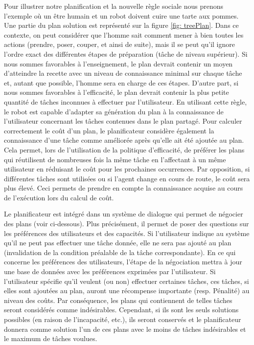 \documentclass[a4paper,11pt,twoside]{StyleThese}
\begin{document}
Pour illustrer notre planification et la nouvelle règle sociale nous prenons l'exemple où un être humain et un robot doivent cuire une tarte aux pommes. Une partie du plan solution est représenté sur la figure \ref{fig: treePlan}. Dans ce contexte, on peut considérer que l'homme sait comment mener à bien toutes les actions (prendre, poser, couper, et ainsi de suite), mais il se peut qu'il ignore  l'ordre exact des différentes étapes de préparation (tâche de niveau supérieur). Si nous sommes favorables à l'enseignement, le plan devrait contenir un moyen d'atteindre la recette avec un niveau de connaissance minimal sur chaque tâche et, autant que possible, l'homme sera en charge de ces étapes. D'autre part, si nous sommes favorables à l'efficacité, le plan devrait contenir la plus petite quantité de tâches inconnues à effectuer par l'utilisateur.
En utilisant cette règle, le robot est capable d'adapter sa génération du plan à la connaissance de l'utilisateur concernant les tâches contenues dans le plan partagé.
Pour calculer correctement le coût d'un plan, le planificateur considère également la connaissance d'une tâche comme améliorée après qu'elle ait été ajoutée au plan. Cela permet, lors de l'utilisation de la politique d'efficacité, de préférer les plans qui réutilisent de nombreuses fois la même tâche en l'affectant à un même utilisateur en réduisant le coût pour les prochaines occurrences. Par opposition, si différentes tâches sont utilisées ou si l'agent change en cours de route, le coût sera plus élevé. Ceci permets de prendre en compte la connaissance acquise au cours de l'exécution lors du calcul de coût.

Le planificateur est intégré dans un système de dialogue qui permet de négocier des plans (voir ci-dessous). Plus précisément, il permet de poser des questions sur les préférences des utilisateurs et des capacités. Si l'utilisateur indique au système qu'il ne peut pas effectuer une tâche donnée, elle ne sera pas ajouté au plan (invalidation de la condition préalable de la tâche correspondante).
En ce qui concerne les préférences des utilisateurs, l'étape de la négociation mettra à jour une base de données avec les préférences exprimées par l'utilisateur. Si l'utilisateur spécifie qu'il veulent (ou non) effectuer certaines tâches, ces tâches, si elles sont ajoutées au plan, auront une récompense importante (resp. Pénalité) au niveau des coûts. Par conséquence, les plans qui contiennent de telles tâches seront considérés comme indésirables. Cependant, si ils sont les seuls solutions possibles (en raison de l'incapacité, etc.), ils seront conservés et le planificateur donnera comme solution l'un de ces plans avec le moins de tâches indésirables et le maximum  de tâches voulues.
\end{document}
